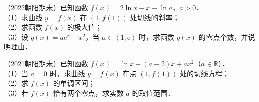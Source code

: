 \begin{example}
（2022朝阳期末）已知函数 $f(x)=2\ln x-x-\ln a$，$a>0$．\\
（1）求曲线 $y=f(x)$ 在 $(1,f(1))$ 处切线的斜率；\\
（2）求函数 $f(x)$ 的极大值；\\
（3）设 $g(x)=a\mathrm{e}^x-x^2$，当 $a\in(1,\mathrm{e})$ 时，求函数 $g(x)$ 的零点个数，并说明理由．
\end{example}

\begin{example}
（2021朝阳期末）已知函数 $f(x)=\ln x-(a+2)x+ax^2$（$a\in\mathbb{R}$）．\\
（1）当 $a=0$ 时，求曲线 $y=f(x)$ 在点 $(1,f(1))$ 处的切线方程；\\
（2）求 $f(x)$ 的单调区间；\\
（3）若 $f(x)$ 恰有两个零点，求实数 $a$ 的取值范围．
\end{example}

